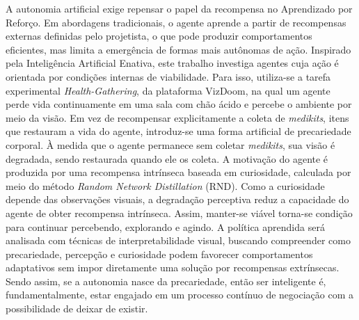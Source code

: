 A autonomia artificial exige repensar o papel da recompensa no Aprendizado por Reforço. Em abordagens tradicionais, o agente aprende a partir de recompensas externas definidas pelo projetista, o que pode produzir comportamentos eficientes, mas limita a emergência de formas mais autônomas de ação. Inspirado pela Inteligência Artificial Enativa, este trabalho investiga agentes cuja ação é orientada por condições internas de viabilidade. Para isso, utiliza-se a tarefa experimental \textit{Health-Gathering}, da plataforma VizDoom, na qual um agente perde vida continuamente em uma sala com chão ácido e percebe o ambiente por meio da visão. Em vez de recompensar explicitamente a coleta de \textit{medikits}, itens que restauram a vida do agente, introduz-se uma forma artificial de precariedade corporal. À medida que o agente permanece sem coletar \textit{medikits}, sua visão é degradada, sendo restaurada quando ele os coleta. A motivação do agente é produzida por uma recompensa intrínseca baseada em curiosidade, calculada por meio do método \textit{Random Network Distillation} (RND). Como a curiosidade depende das observações visuais, a degradação perceptiva reduz a capacidade do agente de obter recompensa intrínseca. Assim, manter-se viável torna-se condição para continuar percebendo, explorando e agindo. A política aprendida será analisada com técnicas de interpretabilidade visual, buscando compreender como precariedade, percepção e curiosidade podem favorecer comportamentos adaptativos sem impor diretamente uma solução por recompensas extrínsecas. Sendo assim, se a autonomia nasce da precariedade, então ser inteligente é, fundamentalmente, estar engajado em um processo contínuo de negociação com a possibilidade de deixar de existir.

